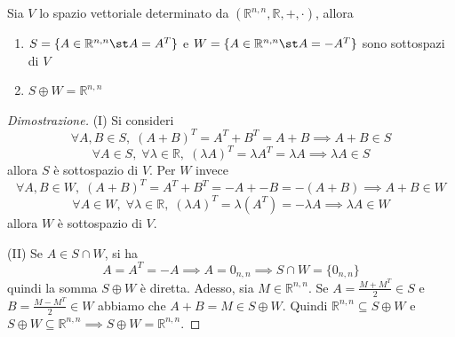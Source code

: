     \vspace{10pt}
    \begin{theorem}
        Sia $V$ lo spazio vettoriale determinato da $(\mathbb{R}^{n, n}, \mathbb{R}, +, \cdot)$, allora
        \begin{enumerate}[label=(\Roman*)]
            \item $S = \{A \in \mathbb{R}^{n, n} \st A = A^{T}\}$ e $W = \{A \in \mathbb{R}^{n, n} \st A = -A^{T}\}$ sono sottospazi di $V$
            \item $S \oplus W = \mathbb{R}^{n, n}$
        \end{enumerate}

    \end{theorem}
    \begin{proof}[Dimostrazione]
        (I) Si consideri
        \[
            \forall A, B \in S, \; (A + B)^{T} = A^T + B^T = A + B \implies A + B \in S
        \]
        \[
            \forall A \in S, \; \forall \lambda \in \mathbb{R}, \; (\lambda A)^T = \lambda A^T = \lambda A \implies \lambda A \in S
        \]
        allora $S$ è sottospazio di $V$. Per $W$ invece
        \[
            \forall A, B \in W, \; (A + B)^{T} = A^T + B^T = -A + -B = -(A + B) \implies A + B \in W
        \]
        \[
            \forall A \in W, \; \forall \lambda \in \mathbb{R}, \; (\lambda A)^T = \lambda (A^T) = - \lambda A \implies \lambda A \in W
        \]
        allora $W$ è sottospazio di $V$.

        \vspace{10pt}
        (II) Se $A \in S \cap W$, si ha
        \[
            A = A^T = -A \implies A = 0_{n, n} \implies S \cap W = \{0_{n, n}\}
        \]
        quindi la somma $S \oplus W$ è diretta. Adesso, sia $M \in \mathbb{R}^{n, n}$. Se $A = \frac{M + M^{T}}{2} \in S$ e $B = \frac{M - M^{T}}{2} \in W$ abbiamo che $A + B = M \in S \oplus W$. Quindi $\mathbb{R}^{n, n} \subseteq S \oplus W$ e $S \oplus W \subseteq \mathbb{R}^{n, n} \implies S \oplus W = \mathbb{R}^{n, n}$.
    \end{proof}

